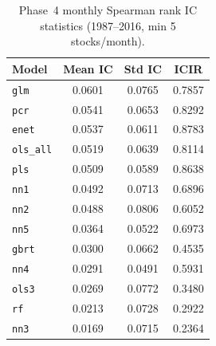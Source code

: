 \begin{table}[H]
\centering
\caption{Phase~4 monthly Spearman rank IC statistics (1987--2016, min 5 stocks/month).}
\label{tab:ic}
\begin{tabular}{lccc}
\toprule
Model & Mean IC & Std IC & ICIR \\
\midrule
\texttt{glm} & 0.0601 & 0.0765 & 0.7857 \\
\texttt{pcr} & 0.0541 & 0.0653 & 0.8292 \\
\texttt{enet} & 0.0537 & 0.0611 & 0.8783 \\
\texttt{ols\_all} & 0.0519 & 0.0639 & 0.8114 \\
\texttt{pls} & 0.0509 & 0.0589 & 0.8638 \\
\texttt{nn1} & 0.0492 & 0.0713 & 0.6896 \\
\texttt{nn2} & 0.0488 & 0.0806 & 0.6052 \\
\texttt{nn5} & 0.0364 & 0.0522 & 0.6973 \\
\texttt{gbrt} & 0.0300 & 0.0662 & 0.4535 \\
\texttt{nn4} & 0.0291 & 0.0491 & 0.5931 \\
\texttt{ols3} & 0.0269 & 0.0772 & 0.3480 \\
\texttt{rf} & 0.0213 & 0.0728 & 0.2922 \\
\texttt{nn3} & 0.0169 & 0.0715 & 0.2364 \\
\bottomrule
\end{tabular}
\end{table}
